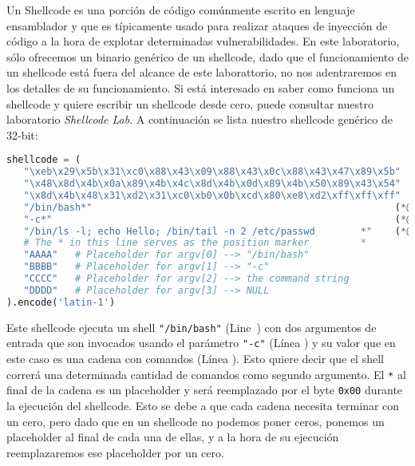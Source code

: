 
Un Shellcode es una porción de código comúnmente escrito en lenguaje ensamblador y que es típicamente usado para realizar ataques de inyección de código a la hora de explotar determinadas vulnerabilidades.
En este laboratorio, sólo ofrecemos un binario genérico de un shellcode, dado que el funcionamiento de un shellcode está fuera del alcance de este laborattorio, no nos adentraremos en los detalles de su funcionamiento.
Si está interesado en saber como funciona un shellcode y quiere escribir un shellcode desde cero, puede consultar nuestro laboratorio \textit{Shellcode Lab}.
A continuación se lista nuestro shellcode genérico de 32-bit:

\begin{lstlisting}[language=python]
shellcode = (
   "\xeb\x29\x5b\x31\xc0\x88\x43\x09\x88\x43\x0c\x88\x43\x47\x89\x5b"
   "\x48\x8d\x4b\x0a\x89\x4b\x4c\x8d\x4b\x0d\x89\x4b\x50\x89\x43\x54"
   "\x8d\x4b\x48\x31\xd2\x31\xc0\xb0\x0b\xcd\x80\xe8\xd2\xff\xff\xff"
   "/bin/bash*"                                                     (*@\ding{202}@*)
   "-c*"                                                            (*@\ding{203}@*)
   "/bin/ls -l; echo Hello; /bin/tail -n 2 /etc/passwd        *"    (*@\ding{204}@*)
   # The * in this line serves as the position marker         *
   "AAAA"   # Placeholder for argv[0] --> "/bin/bash"
   "BBBB"   # Placeholder for argv[1] --> "-c"
   "CCCC"   # Placeholder for argv[2] --> the command string
   "DDDD"   # Placeholder for argv[3] --> NULL
).encode('latin-1')
\end{lstlisting}

Este shellcode ejecuta un shell \texttt{"/bin/bash"} (Line~) con dos argumentos de entrada que son invocados usando el parámetro \texttt{"-c"} (Línea ) y su valor que en este caso es una cadena con comandos (Línea ). Esto quiere decir que el shell correrá una determinada cantidad de comandos como segundo argumento.
El \texttt{*} al final de la cadena es un placeholder y será reemplazado por el byte \texttt{0x00} durante la ejecución del shellcode.
Esto se debe a que cada cadena necesita terminar con un cero, pero dado que en un shellcode no podemos poner ceros, ponemos un placeholder al final de cada una de ellas, y a la hora de su ejecución reemplazaremos ese placeholder por un cero.

